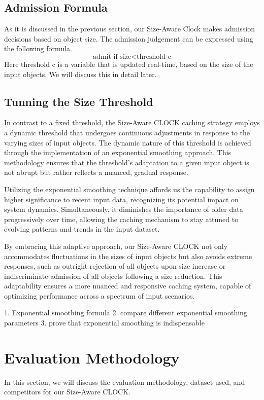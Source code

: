 \documentclass[conference]{IEEEtran}
\begin{document}
\subsection{Admission Formula}
As it is discussed in the previous section, our Size-Aware Clock makes admission decisions based on object size. The admission judgement can be expressed using the following formula.
\[
\text{admit if } \text{size} < \text{threshold} \text{ c}
\]
Here threshold c is a variable that is updated real-time, based on the size of the input objects. We will discuss this in detail later.

\subsection{Tunning the Size Threshold}
In contrast to a fixed threshold, the Size-Aware CLOCK caching strategy employs a dynamic threshold that undergoes continuous adjustments in response to the varying sizes of input objects. The dynamic nature of this threshold is achieved through the implementation of an exponential smoothing approach. This methodology ensures that the threshold's adaptation to a given input object is not abrupt but rather reflects a nuanced, gradual response.

Utilizing the exponential smoothing technique affords us the capability to assign higher significance to recent input data, recognizing its potential impact on system dynamics. Simultaneously, it diminishes the importance of older data progressively over time, allowing the caching mechanism to stay attuned to evolving patterns and trends in the input dataset.

By embracing this adaptive approach, our Size-Aware CLOCK not only accommodates fluctuations in the sizes of input objects but also avoids extreme responses, such as outright rejection of all objects upon size increase or indiscriminate admission of all objects following a size reduction. This adaptability ensures a more nuanced and responsive caching system, capable of optimizing performance across a spectrum of input scenarios. 

1. Exponential smoothing formula
2. compare different exponential smoothing parameters
3. prove that exponential smoothing is indispensable 


\section{Evaluation Methodology}
In this section, we will discuss the evaluation methodology, dataset used, and competitors for our Size-Aware CLOCK.
\end{document}
